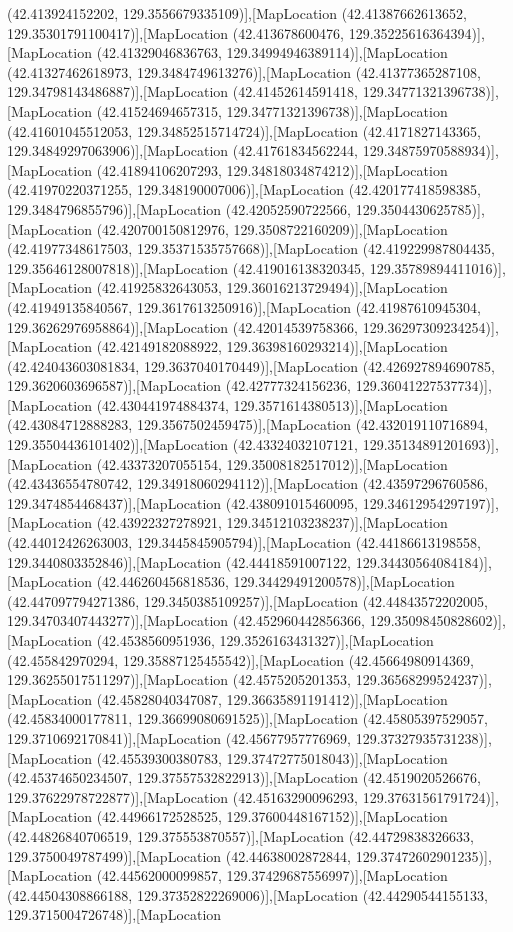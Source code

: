 (42.413924152202, 129.3556679335109)],[MapLocation (42.41387662613652, 129.35301791100417)],[MapLocation (42.413678600476, 129.35225616364394)],[MapLocation (42.41329046836763, 129.34994946389114)],[MapLocation (42.41327462618973, 129.3484749613276)],[MapLocation (42.41377365287108, 129.34798143486887)],[MapLocation (42.41452614591418, 129.34771321396738)],[MapLocation (42.41524694657315, 129.34771321396738)],[MapLocation (42.41601045512053, 129.34852515714724)],[MapLocation (42.4171827143365, 129.34849297063906)],[MapLocation (42.41761834562244, 129.34875970588934)],[MapLocation (42.41894106207293, 129.34818034874212)],[MapLocation (42.41970220371255, 129.348190007006)],[MapLocation (42.420177418598385, 129.3484796855796)],[MapLocation (42.42052590722566, 129.3504430625785)],[MapLocation (42.420700150812976, 129.3508722160209)],[MapLocation (42.41977348617503, 129.35371535757668)],[MapLocation (42.419229987804435, 129.35646128007818)],[MapLocation (42.419016138320345, 129.35789894411016)],[MapLocation (42.41925832643053, 129.36016213729494)],[MapLocation (42.41949135840567, 129.3617613250916)],[MapLocation (42.41987610945304, 129.36262976958864)],[MapLocation (42.42014539758366, 129.36297309234254)],[MapLocation (42.42149182088922, 129.36398160293214)],[MapLocation (42.424043603081834, 129.3637040170449)],[MapLocation (42.426927894690785, 129.3620603696587)],[MapLocation (42.42777324156236, 129.36041227537734)],[MapLocation (42.430441974884374, 129.3571614380513)],[MapLocation (42.43084712888283, 129.3567502459475)],[MapLocation (42.432019110716894, 129.35504436101402)],[MapLocation (42.43324032107121, 129.35134891201693)],[MapLocation (42.43373207055154, 129.35008182517012)],[MapLocation (42.43436554780742, 129.34918060294112)],[MapLocation (42.43597296760586, 129.3474854468437)],[MapLocation (42.438091015460095, 129.34612954297197)],[MapLocation (42.43922327278921, 129.34512103238237)],[MapLocation (42.44012426263003, 129.3445845905794)],[MapLocation (42.44186613198558, 129.3440803352846)],[MapLocation (42.44418591007122, 129.34430564084184)],[MapLocation (42.446260456818536, 129.34429491200578)],[MapLocation (42.447097794271386, 129.3450385109257)],[MapLocation (42.44843572202005, 129.34703407443277)],[MapLocation (42.452960442856366, 129.35098450828602)],[MapLocation (42.4538560951936, 129.3526163431327)],[MapLocation (42.455842970294, 129.35887125455542)],[MapLocation (42.45664980914369, 129.36255017511297)],[MapLocation (42.4575205201353, 129.36568299524237)],[MapLocation (42.45828040347087, 129.36635891191412)],[MapLocation (42.45834000177811, 129.36699080691525)],[MapLocation (42.45805397529057, 129.3710692170841)],[MapLocation (42.45677957776969, 129.37327935731238)],[MapLocation (42.45539300380783, 129.37472775018043)],[MapLocation (42.45374650234507, 129.37557532822913)],[MapLocation (42.4519020526676, 129.37622978722877)],[MapLocation (42.45163290096293, 129.37631561791724)],[MapLocation (42.44966172528525, 129.37600448167152)],[MapLocation (42.44826840706519, 129.375553870557)],[MapLocation (42.44729838326633, 129.3750049787499)],[MapLocation (42.44638002872844, 129.37472602901235)],[MapLocation (42.44562000099857, 129.37429687556997)],[MapLocation (42.44504308866188, 129.37352822269006)],[MapLocation (42.44290544155133, 129.3715004726748)],[MapLocation 
